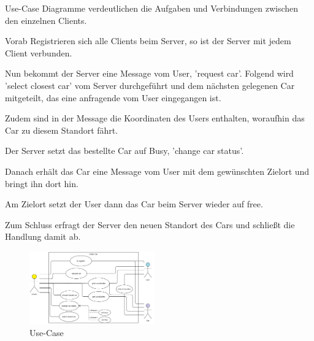 Use-Case Diagramme verdeutlichen die 
Aufgaben und Verbindungen zwischen den einzelnen Clients.

Vorab Registrieren sich alle Clients beim Server, so ist der Server mit jedem Client verbunden.

Nun bekommt der Server eine Message vom User, 'request car'.
Folgend wird 'select closest car' vom Server durchgeführt und dem nächsten gelegenen Car mitgeteilt, das eine anfragende vom User eingegangen ist.

Zudem sind in der Message die Koordinaten des Users enthalten, woraufhin das Car zu diesem Standort fährt.

Der Server setzt das bestellte Car auf Busy, 'change car status'.

Danach erhält das Car eine Message vom User mit dem gewünschten Zielort und bringt ihn dort hin. 

Am Zielort setzt der User dann das Car beim Server wieder auf free.

Zum Schluss erfragt der Server den neuen Standort des Cars und schließt die Handlung damit ab.


\begin{figure}[htbp] 
  \centering
     \includegraphics[width=0.48\textwidth]{Use-Case_Server.png}
     \caption{Use-Case}
\end{figure}


